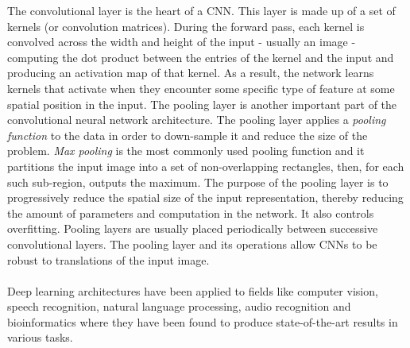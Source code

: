 The convolutional layer is the heart of a CNN. This layer is made up of a set of kernels (or convolution matrices). During the forward pass, each kernel is convolved across the width and height of the input - usually an image - computing the dot product between the entries of the kernel and the input and producing an activation map of that kernel. As a result, the network learns kernels that activate when they encounter some specific type of feature at some spatial position in the input. The pooling layer is another important part of the convolutional neural network architecture. The pooling layer applies a \textit{pooling function} to the data in order to down-sample it and reduce the size of the problem. \textit{Max pooling} is the most commonly used pooling function and  it partitions the input image into a set of non-overlapping rectangles, then, for each such sub-region, outputs the maximum. The purpose of the pooling layer is to progressively reduce the spatial size of the input representation, thereby reducing the amount of parameters and computation in the network. It also controls overfitting. Pooling layers are usually placed periodically between successive convolutional layers. The pooling layer and its operations allow CNNs to be robust to translations of the input image.\\ \\
%
Deep learning architectures have been applied to fields like computer vision, speech recognition, natural language processing, audio recognition and bioinformatics where they have been found to produce state-of-the-art results in various tasks.

\bigskip


